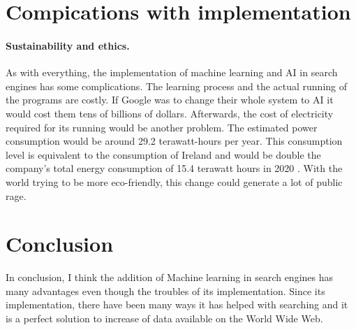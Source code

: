 \documentclass[10pt,a4paper]{article}
\begin{document}
\section{Compications with implementation}
\paragraph{Sustainability and ethics.}
\cite{FootprintofAI}As with everything, the implementation of machine learning and AI in search engines has some complications. The learning process and the actual running of the programs are costly. If Google was to change their whole system to AI it would cost them tens of billions of dollars. Afterwards, the cost of electricity required for its running would be another problem. The estimated power consumption would be around 29.2 terawatt-hours per year. This consumption level is equivalent to the consumption of Ireland and would be double the company's total energy consumption of 15.4 terawatt hours in 2020 \cite{Google2021}. With the world trying to be more eco-friendly, this change could generate a lot of public rage.

\section{Conclusion} 
In conclusion, I think the addition of Machine learning in search engines has many advantages even though the troubles of its implementation. Since its implementation, there have been many ways it has helped with searching and it is a perfect solution to increase of data available on the World Wide Web.  


 
\end{document}
